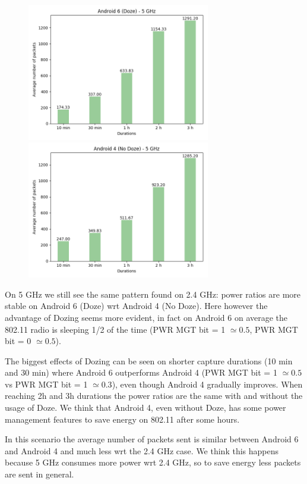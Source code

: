 \documentclass[11pt, a4paper]{article}
\begin{document}
        \begin{figure}[ht]
           \centerline{
              \includegraphics[width=8cm]{06_doze6_avg_pkt_5.png}
              \hfill
              \includegraphics[width=8cm]{07_nodoze4_avg_pkt_5.png}
           }
        \end{figure}
        
        On 5 GHz we still see the same pattern found on 2.4 GHz: power ratios are more stable on Android 6 (Doze) wrt Android 4 (No Doze). 
        Here however the advantage of Dozing seems more evident, in fact on Android 6 on average the 802.11 radio is sleeping 1/2 of the time (PWR MGT bit = 1 $\simeq{0.5}$, PWR MGT bit = 0 $\simeq{0.5}$).
        
        The biggest effects of Dozing can be seen on shorter capture durations (10 min and 30 min) where Android 6 outperforms Android 4 (PWR MGT bit = 1 $\simeq{0.5}$ vs PWR MGT bit = 1 $\simeq{0.3}$), even though Android 4 gradually improves. When reaching 2h and 3h durations the power ratios are the same with and without the usage of Doze. We think that Android 4, even without Doze, has some power management features to save energy on 802.11 after some hours.
        
        In this scenario the average number of packets sent is similar between Android 6 and Android 4 and much less wrt the 2.4 GHz case. We think this happens because 5 GHz consumes more power wrt 2.4 GHz, so to save energy less packets are sent in general.
    
\end{document}

